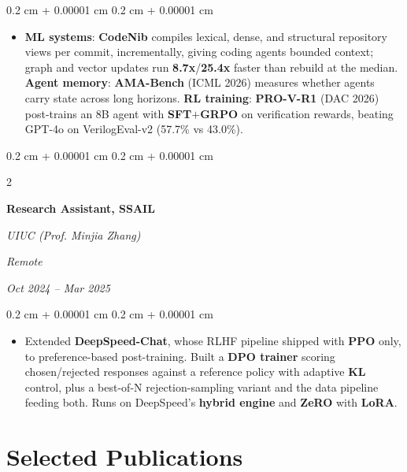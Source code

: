 \documentclass[10pt, letterpaper]{article}
\newenvironment{highlights}{
    \begin{itemize}[
        topsep=0.02 cm,
        parsep=0.02 cm,
        partopsep=0pt,
        itemsep=0pt,
        leftmargin=0.2 cm + 10pt
    ]
}{
    \end{itemize}
} %
\newenvironment{onecolentry}{
    \begin{adjustwidth}{
        0.2 cm + 0.00001 cm
    }{
        0.2 cm + 0.00001 cm
    }
}{
    \end{adjustwidth}
} %
\newenvironment{twocolentry}[2][]{
    \onecolentry
    \def\secondColumn{#2}
    \setcolumnwidth{\fill, 4.5 cm}
    \begin{paracol}{2}
}{
    \switchcolumn \raggedleft \secondColumn
    \end{paracol}
    \endonecolentry
} %
\begin{document}
        \vspace{0.05 cm}
        \begin{onecolentry}
            \begin{highlights}
                \item \textbf{ML systems}: \textbf{CodeNib} compiles lexical, dense, and structural repository views per commit, incrementally, giving coding agents bounded context; graph and vector updates run \textbf{8.7x}/\textbf{25.4x} faster than rebuild at the median. \textbf{Agent memory}: \textbf{AMA-Bench} (ICML 2026) measures whether agents carry state across long horizons. \textbf{RL training}: \textbf{PRO-V-R1} (DAC 2026) post-trains an 8B agent with \textbf{SFT}$+$\textbf{GRPO} on verification rewards, beating GPT-4o on VerilogEval-v2 (57.7\% vs 43.0\%).
            \end{highlights}
        \end{onecolentry}

        \vspace{0.1 cm}

        \begin{twocolentry}{
            \textit{Remote}

            \textit{Oct 2024 – Mar 2025}}
            \textbf{Research Assistant, SSAIL}

            \textit{UIUC (Prof. Minjia Zhang)}
        \end{twocolentry}

        \vspace{0.05 cm}
        \begin{onecolentry}
            \begin{highlights}
                \item Extended \textbf{DeepSpeed-Chat}, whose RLHF pipeline shipped with \textbf{PPO} only, to preference-based post-training. Built a \textbf{DPO trainer} scoring chosen/rejected responses against a reference policy with adaptive \textbf{KL} control, plus a best-of-N rejection-sampling variant and the data pipeline feeding both. Runs on DeepSpeed's \textbf{hybrid engine} and \textbf{ZeRO} with \textbf{LoRA}.
            \end{highlights}
        \end{onecolentry}

\section{Selected Publications}
\end{document}
